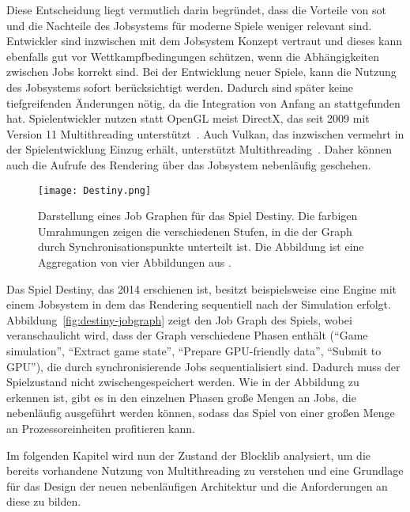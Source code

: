 Diese Entscheidung liegt vermutlich darin begründet, dass die Vorteile von \ac{sot}  und die Nachteile des Jobsystems für moderne Spiele weniger relevant sind. Entwickler sind inzwischen mit dem Jobsystem Konzept vertraut und dieses kann ebenfalls gut vor Wettkampfbedingungen schützen, wenn die Abhängigkeiten zwischen Jobs korrekt sind. Bei der Entwicklung neuer Spiele, kann die Nutzung des Jobsystems sofort berücksichtigt werden. Dadurch sind später keine tiefgreifenden Änderungen nötig, da die Integration von Anfang an stattgefunden hat. Spielentwickler nutzen statt OpenGL meist DirectX, das seit 2009 mit Version 11 Multithreading unterstützt~\cite{White2018}. Auch Vulkan, das inzwischen vermehrt in der Spielentwicklung Einzug erhält, unterstützt Multithreading~\cite{Schott2016}. Daher können auch die Aufrufe des Rendering über das Jobsystem nebenläufig geschehen.

\begin{figure}
	\texttt{[image: Destiny.png]}
	 \caption[Darstellung eines Job Graphen für das Spiel Destiny.]{Darstellung eines Job Graphen für das Spiel Destiny. Die farbigen Umrahmungen zeigen die verschiedenen Stufen, in die der Graph durch Synchronisationspunkte unterteilt ist. Die Abbildung ist eine Aggregation von vier Abbildungen aus \cite[S.~39~ff.]{Tatarchuk2014}.}\label{fig:destiny-jobgraph}
\end{figure}


Das Spiel Destiny, das 2014 erschienen ist, besitzt beispielsweise eine Engine mit einem Jobsystem in dem das Rendering sequentiell nach der Simulation erfolgt. Abbildung~\vref{fig:destiny-jobgraph} zeigt den Job Graph des Spiels, wobei veranschaulicht wird, dass der Graph verschiedene Phasen enthält (\enquote{Game simulation}, \enquote{Extract game state}, \enquote{Prepare GPU-friendly data}, \enquote{Submit to GPU}), die durch synchronisierende Jobs sequentialisiert sind. Dadurch muss der Spielzustand nicht zwischengespeichert werden. Wie in der Abbildung zu erkennen ist, gibt es in den einzelnen Phasen große Mengen an Jobs, die nebenläufig ausgeführt werden können, sodass das Spiel von einer großen Menge an Prozessoreinheiten profitieren kann.

Im folgenden Kapitel wird nun der Zustand der Blocklib analysiert, um die bereits vorhandene Nutzung von Multithreading zu verstehen und eine Grundlage für das Design der neuen nebenläufigen Architektur und die Anforderungen an diese zu bilden.